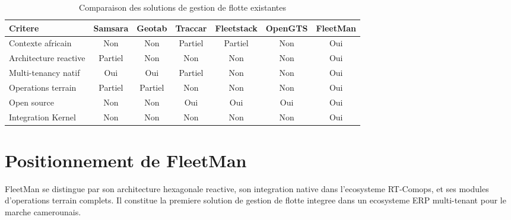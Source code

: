 \documentclass[12pt,a4paper]{report}
\begin{document}
\begin{table}[H]
\caption{Comparaison des solutions de gestion de flotte existantes}
\label{tab:comparaison_solutions}
\centering\small
\begin{tabularx}{\textwidth}{Xcccccc}
\toprule
\textbf{Critere} & \textbf{Samsara} & \textbf{Geotab} & \textbf{Traccar}
  & \textbf{Fleetstack} & \textbf{OpenGTS} & \textbf{FleetMan} \\
\midrule
Contexte africain
  & \textcolor{fleeterror}{Non} & \textcolor{fleeterror}{Non}
  & \textcolor{fleetwarning}{Partiel} & \textcolor{fleetwarning}{Partiel}
  & \textcolor{fleeterror}{Non} & \textcolor{fleetsuccess}{Oui} \\
Architecture reactive
  & \textcolor{fleetwarning}{Partiel} & \textcolor{fleeterror}{Non}
  & \textcolor{fleeterror}{Non} & \textcolor{fleeterror}{Non}
  & \textcolor{fleeterror}{Non} & \textcolor{fleetsuccess}{Oui} \\
Multi-tenancy natif
  & \textcolor{fleetsuccess}{Oui} & \textcolor{fleetsuccess}{Oui}
  & \textcolor{fleetwarning}{Partiel} & \textcolor{fleeterror}{Non}
  & \textcolor{fleeterror}{Non} & \textcolor{fleetsuccess}{Oui} \\
Operations terrain
  & \textcolor{fleetwarning}{Partiel} & \textcolor{fleetwarning}{Partiel}
  & \textcolor{fleeterror}{Non} & \textcolor{fleeterror}{Non}
  & \textcolor{fleeterror}{Non} & \textcolor{fleetsuccess}{Oui} \\
Open source
  & \textcolor{fleeterror}{Non} & \textcolor{fleeterror}{Non}
  & \textcolor{fleetsuccess}{Oui} & \textcolor{fleetsuccess}{Oui}
  & \textcolor{fleetsuccess}{Oui} & \textcolor{fleetsuccess}{Oui} \\
Integration Kernel
  & \textcolor{fleeterror}{Non} & \textcolor{fleeterror}{Non}
  & \textcolor{fleeterror}{Non} & \textcolor{fleeterror}{Non}
  & \textcolor{fleeterror}{Non} & \textcolor{fleetsuccess}{Oui} \\
\bottomrule
\end{tabularx}
\end{table}

\section{Positionnement de FleetMan}

FleetMan se distingue par son architecture hexagonale reactive, son
integration native dans l'ecosysteme RT-Comops, et ses modules d'operations
terrain complets. Il constitue la premiere solution de gestion de flotte
integree dans un ecosysteme ERP multi-tenant pour le marche camerounais.
\end{document}

